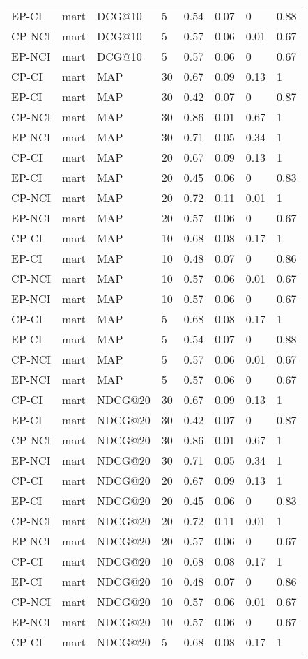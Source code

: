 \begin{landscape}
\begin{longtable}{|*{8}{l|}}
EP-CI&mart&DCG@10&5&0.54&0.07&0&0.88\\
CP-NCI&mart&DCG@10&5&0.57&0.06&0.01&0.67\\
EP-NCI&mart&DCG@10&5&0.57&0.06&0&0.67\\
\hline
CP-CI&mart&MAP&30&0.67&0.09&0.13&1\\
EP-CI&mart&MAP&30&0.42&0.07&0&0.87\\
CP-NCI&mart&MAP&30&0.86&0.01&0.67&1\\
EP-NCI&mart&MAP&30&0.71&0.05&0.34&1\\
\hline
CP-CI&mart&MAP&20&0.67&0.09&0.13&1\\
EP-CI&mart&MAP&20&0.45&0.06&0&0.83\\
CP-NCI&mart&MAP&20&0.72&0.11&0.01&1\\
EP-NCI&mart&MAP&20&0.57&0.06&0&0.67\\
\hline
CP-CI&mart&MAP&10&0.68&0.08&0.17&1\\
EP-CI&mart&MAP&10&0.48&0.07&0&0.86\\
CP-NCI&mart&MAP&10&0.57&0.06&0.01&0.67\\
EP-NCI&mart&MAP&10&0.57&0.06&0&0.67\\
\hline
CP-CI&mart&MAP&5&0.68&0.08&0.17&1\\
EP-CI&mart&MAP&5&0.54&0.07&0&0.88\\
CP-NCI&mart&MAP&5&0.57&0.06&0.01&0.67\\
EP-NCI&mart&MAP&5&0.57&0.06&0&0.67\\
\hline
CP-CI&mart&NDCG@20&30&0.67&0.09&0.13&1\\
EP-CI&mart&NDCG@20&30&0.42&0.07&0&0.87\\
CP-NCI&mart&NDCG@20&30&0.86&0.01&0.67&1\\
EP-NCI&mart&NDCG@20&30&0.71&0.05&0.34&1\\
\hline
CP-CI&mart&NDCG@20&20&0.67&0.09&0.13&1\\
EP-CI&mart&NDCG@20&20&0.45&0.06&0&0.83\\
CP-NCI&mart&NDCG@20&20&0.72&0.11&0.01&1\\
EP-NCI&mart&NDCG@20&20&0.57&0.06&0&0.67\\
\hline
CP-CI&mart&NDCG@20&10&0.68&0.08&0.17&1\\
EP-CI&mart&NDCG@20&10&0.48&0.07&0&0.86\\
CP-NCI&mart&NDCG@20&10&0.57&0.06&0.01&0.67\\
EP-NCI&mart&NDCG@20&10&0.57&0.06&0&0.67\\
\hline
CP-CI&mart&NDCG@20&5&0.68&0.08&0.17&1\\

\end{longtable}
\end{landscape}
